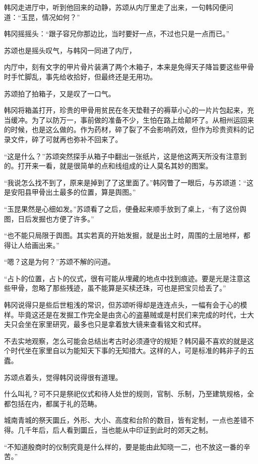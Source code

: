 韩冈走进厅中，听到他回来的动静，苏颂从内厅里走了出来，一句韩冈便问道：“玉昆，情况如何？”

韩冈摇摇头：“跟子容兄你那边比，当时要好一点，不过也只是一点而已。”

苏颂也是摇头叹气，与韩冈一同进了内厅，

内厅中，刻有文字的甲片骨片装满了两个木箱子，本来是免得天子降旨要这些甲骨时手忙脚乱，事先给收拾好，但最终还是无用功。

苏颂拍了拍箱子，又是叹了一口气。

韩冈将箱盖打开，珍贵的甲骨用贫民在冬天垫鞋子的褥草小心的一片片包起来，充当缓冲。为了以防万一，事前做的准备不少，生怕在路上给颠坏了。从相州运回来的时候，也是这么做的。作为药材，碎了裂了不会影响药效，但作为珍贵资料的记录文件，碎了可就再也弥补不回来了。

“这是什么？”苏颂突然探手从箱子中翻出一张纸片，这是他这两天所没有注意到的。打开来一看，就是很简单的点和线组成的让人莫名其妙的图案。

“我说怎么找不到了，原来是掉到了了这里面了。”韩冈瞥了一眼后，与苏颂道：“这是安阳县甲骨出土最多的位置，算是舆图。”

“玉昆果然是心细如发。”苏颂看了之后，便叠起来顺手放到了桌上，“有了这份舆图，日后发掘也方便了许多。”

“也不能只局限于舆图。其实若真的开始发掘，就是出土时，周围的土层地样，都得让人给画出来。”

“嗯？这是为何？”苏颂不解的问道。

“占卜的位置，占卜的仪式，很有可能从埋藏的地点中找到痕迹。要是光是注意这些甲骨，忽略了那些残迹，虽不能算是买椟还珠，可也是把宝贝给丢了。”

韩冈说得只是些后世粗浅的常识，但苏颂听得却是连连点头，一幅有会于心的模样。毕竟这还是在发掘工作完全是由贪心的盗墓贼或是村民们来完成的时代，士大夫只会坐在家里研究，最多也只是拿着放大镜来查看铭文和式样。

不去实地观察，怎么可能会总结出考古时必须遵守的规矩？韩冈最不喜欢的就是这个时代坐在家里自以为能知天下事的无知措大。这样的人，可是标准的韩非子的五蠹。

苏颂点着头，觉得韩冈说得很有道理。

什么叫礼？可不只是祭祀仪式和待人处世的规则，官制、乐制，乃至建筑规格，全都包括在内，都属于礼的范畴。

城南青城的祭天圜丘，外形、大小、高度和台阶的数目，皆有定制，一点也差错不得。几千年后，后人看到圜丘，当也能从中印证到此时的郊天之制。

“不知道殷商时的仪制究竟是什么样的，要是能由此知晓一二，也不放这一番的辛苦。”

